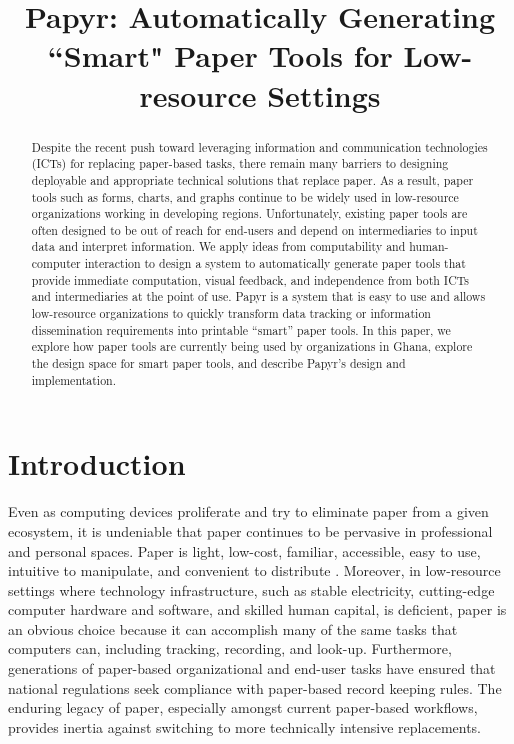 \documentclass{sig-alternate}
\begin{document}
\newcommand{\nifty}{\textsf{Papyr}\xspace}

\title{Papyr: Automatically Generating ``Smart" Paper Tools for Low-resource Settings}
\author{}
\maketitle

\begin{abstract}

Despite the recent push toward leveraging information and communication technologies (ICTs) for replacing paper-based tasks, there remain many barriers to designing deployable and appropriate technical solutions that replace paper.
As a result, paper tools such as forms, charts, and graphs continue to be widely used in low-resource organizations working in developing regions.
Unfortunately, existing paper tools are often designed to be out of reach for end-users and depend on intermediaries to input data and interpret information. 
We apply ideas from computability and human-computer interaction to design a system to automatically generate paper tools that provide immediate computation, visual feedback, and independence from both ICTs and intermediaries at the point of use. 
\nifty is a system that is easy to use and allows low-resource organizations to quickly transform data tracking or information dissemination requirements into printable ``smart'' paper tools. 
In this paper, we explore how paper tools are currently being used by organizations in Ghana, explore the design space for smart paper tools, and describe \nifty's design and implementation.

\end{abstract}



\section{Introduction}


Even as computing devices proliferate and try to eliminate paper from a given ecosystem, it is undeniable that paper continues to be pervasive in professional and personal spaces.
Paper is light, low-cost, familiar, accessible, easy to use, intuitive to manipulate, and convenient to distribute \cite{sellen1997,sellen2002,johnson1993}. Moreover, in low-resource settings where technology infrastructure, such as stable electricity, cutting-edge computer hardware and software, and skilled human capital, is deficient, paper is an obvious choice because it can accomplish many of the same tasks that computers can, including tracking, recording, and look-up. Furthermore, generations of paper-based organizational and end-user tasks have ensured that national regulations seek compliance with paper-based record keeping rules. The enduring legacy of paper, especially amongst current paper-based workflows, provides inertia against switching to more technically intensive replacements. 
\end{document}
